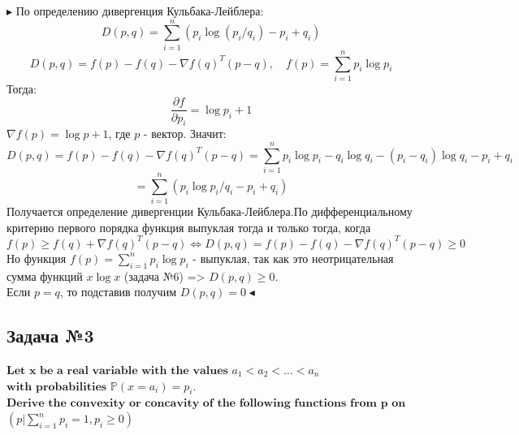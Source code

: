 \documentclass[12pt,letterpaper]{article}
\begin{document}
$\blacktriangleright$ По определению дивергенция Кульбака-Лейблера:
$$
D(p, q)=\sum_{i=1}^{n}\left(p_{i} \log \left(p_{i} / q_{i}\right)-p_{i}+q_{i}\right)
$$
$$
D(p, q)=f(p)-f(q)-\nabla f(q)^{T}(p-q), \quad f(p)=\sum_{i=1}^{n} p_{i} \log p_{i}
$$
Тогда: 
$$
\frac{\partial f}{\partial p_{i}}=\log p_i+1
$$
$ \nabla f(p)=\log p+1 $, где $ p $ - вектор. Значит:
$$
D(p, q)=f(p)-f(q)-\nabla f(q)^{T}(p-q) = \sum\limits_ {i=1}^{n} p_i \log p_{i} - q_{i} \log q_{i}-\left(p_{i}-q_{i}\right) \log {q_i} -p_{i}+q_{i}
$$
$$
=\sum\limits_{i=1}^{n}\left(p_i \log p_{i} / q_{i}-p_{i}+q_{i}\right)
$$
Получается определение дивергенции Кульбака-Лейблера.По дифференциальному критерию первого порядка функция выпуклая тогда и только тогда, когда 
$$
f(p) \geqslant f(q) + \nabla f(q)^{T}(p-q) \Leftrightarrow D(p, q)=f(p)-f(q)-\nabla f(q)^{T}(p-q) \geqslant 0
$$
Но функция $ f(p)=\sum_{i=1}^{n} p_{i} \log p_{i} $ - выпуклая, так как это неотрицательная сумма функций $ x \log x $ (задача №6) => $ D(p, q) \geqslant 0 $. \\ Если $ p = q $, то подставив получим $ D(p, q) = 0 \blacktriangleleft$


\subsection*{Задача №3}
$\textbf{Let x be a real variable with the values}$ $ a_1 < a_2 < \ldots < a_n $ $\textbf{with probabilities}$ $ \mathbb{P}(x = a_i) = p_i$. $\textbf{Derive the convexity or concavity of the following functions from p on the set of}$ $\left( p | \sum\limits_{i=1}^n p_i = 1, p_i \geqslant 0 \right) $
\end{document}

